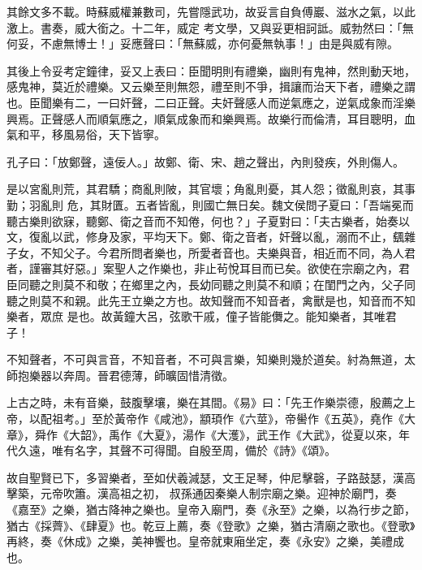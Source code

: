 \begin{pinyinscope}
 其餘文多不載。時蘇威權兼數司，先嘗隱武功，故妥言自負傅巖、滋水之氣，以此激上。書奏，威大銜之。十二年，威定
 考文學，又與妥更相訶詆。威勃然曰：「無何妥，不慮無博士！」妥應聲曰：「無蘇威，亦何憂無執事！」由是與威有隙。



 其後上令妥考定鐘律，妥又上表曰：臣聞明則有禮樂，幽則有鬼神，然則動天地，感鬼神，莫近於禮樂。又云樂至則無怨，禮至則不爭，揖讓而治天下者，禮樂之謂也。臣聞樂有二，一曰奸聲，二曰正聲。夫奸聲感人而逆氣應之，逆氣成象而淫樂興焉。正聲感人而順氣應之，順氣成象而和樂興焉。故樂行而倫清，耳目聰明，血氣和平，移風易俗，天下皆寧。



 孔子曰：「放鄭聲，遠佞人。」故鄭、衛、宋、趙之聲出，內則發疾，外則傷人。



 是以宮亂則荒，其君驕；商亂則陂，其官壞；角亂則憂，其人怨；徵亂則哀，其事勤；羽亂則
 危，其財匱。五者皆亂，則國亡無日矣。魏文侯問子夏曰：「吾端冕而聽古樂則欲寐，聽鄭、衛之音而不知倦，何也？」子夏對曰：「夫古樂者，始奏以文，復亂以武，修身及家，平均天下。鄭、衛之音者，奸聲以亂，溺而不止，颻雜子女，不知父子。今君所問者樂也，所愛者音也。夫樂與音，相近而不同，為人君者，謹審其好惡。」案聖人之作樂也，非止茍悅耳目而已矣。欲使在宗廟之內，君臣同聽之則莫不和敬；在鄉里之內，長幼同聽之則莫不和順；在閨門之內，父子同聽之則莫不和親。此先王立樂之方也。故知聲而不知音者，禽獸是也，知音而不知樂者，眾庶
 是也。故黃鐘大呂，弦歌干戚，僮子皆能儛之。能知樂者，其唯君子！



 不知聲者，不可與言音，不知音者，不可與言樂，知樂則幾於道矣。紂為無道，太師抱樂器以奔周。晉君德薄，師曠固惜清徵。



 上古之時，未有音樂，鼓腹擊壤，樂在其間。《易》曰：「先王作樂崇德，殷薦之上帝，以配祖考。」至於黃帝作《咸池》，顓頊作《六莖》，帝嚳作《五英》，堯作《大章》，舜作《大韶》，禹作《大夏》，湯作《大濩》，武王作《大武》，從夏以來，年代久遠，唯有名字，其聲不可得聞。自殷至周，備於《詩》《頌》。



 故自聖賢已下，多習樂者，至如伏羲減瑟，文王足琴，仲尼擊磬，子路鼓瑟，漢高擊築，元帝吹簫。漢高祖之初，
 叔孫通因秦樂人制宗廟之樂。迎神於廟門，奏《嘉至》之樂，猶古降神之樂也。皇帝入廟門，奏《永至》之樂，以為行步之節，猶古《採薺》、《肆夏》也。乾豆上薦，奏《登歌》之樂，猶古清廟之歌也。《登歌》再終，奏《休成》之樂，美神饗也。皇帝就東廂坐定，奏《永安》之樂，美禮成也。




\end{pinyinscope}
